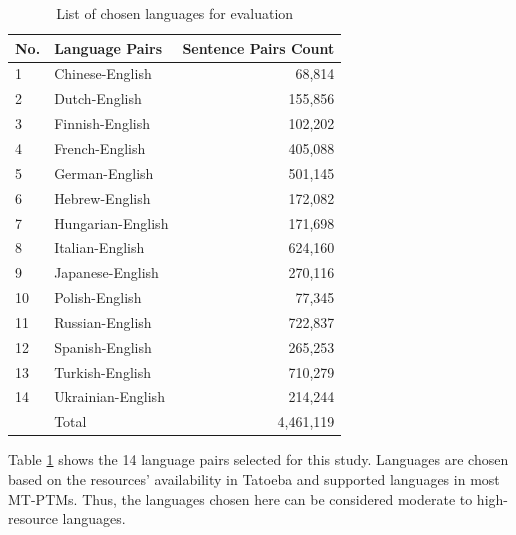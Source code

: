 \documentclass[a4paper, 11pt]{article}
\begin{document}
\begin{table}[htbp]
    \centering
    \large
    \begin{tabular}{llr}
        \hline
        \textbf{No.} & \textbf{Language Pairs} & \textbf{Sentence Pairs Count} \\
        \hline
        1            & Chinese-English         & 68,814                        \\
        2            & Dutch-English           & 155,856                       \\
        3            & Finnish-English         & 102,202                       \\
        4            & French-English          & 405,088                       \\
        5            & German-English          & 501,145                       \\
        6            & Hebrew-English          & 172,082                       \\
        7            & Hungarian-English       & 171,698                       \\
        8            & Italian-English         & 624,160                       \\
        9            & Japanese-English        & 270,116                       \\
        10           & Polish-English          & 77,345                        \\
        11           & Russian-English         & 722,837                       \\
        12           & Spanish-English         & 265,253                       \\
        13           & Turkish-English         & 710,279                       \\
        14           & Ukrainian-English       & 214,244                       \\
        \hline
                     & Total                   & 4,461,119                     \\
        \hline
    \end{tabular}
    \caption{List of chosen languages for evaluation}
    \label{table:eval_languages}
\end{table}

Table \ref{table:eval_languages} shows the 14 language pairs selected for this study. Languages are chosen based on the resources' availability in Tatoeba and supported languages in most MT-PTMs. Thus, the languages chosen here can be considered moderate to high-resource languages.
\end{document}
